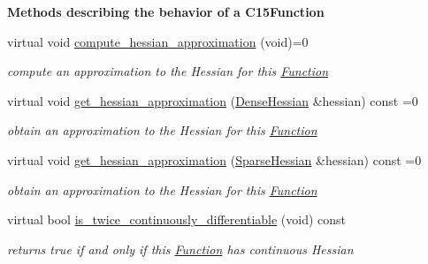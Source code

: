 \begin{Indent}\textbf{ Methods describing the behavior of a C15\+Function}\par
\begin{DoxyCompactItemize}
\item 
virtual void \mbox{\hyperlink{class_s_m_spp__di__unipi__it_1_1_c15_function_a50c8f5b1802c658a795d266ba66e3c29}{compute\+\_\+hessian\+\_\+approximation}} (void)=0
\begin{DoxyCompactList}\small\item\em compute an approximation to the Hessian for this \mbox{\hyperlink{class_s_m_spp__di__unipi__it_1_1_function}{Function}} \end{DoxyCompactList}\item 
virtual void \mbox{\hyperlink{class_s_m_spp__di__unipi__it_1_1_c15_function_a83dab9644742319aa313786952a15a78}{get\+\_\+hessian\+\_\+approximation}} (\mbox{\hyperlink{class_s_m_spp__di__unipi__it_1_1_c15_function_ae7dd5ecf6e8711dc10787bb8d80b355b}{Dense\+Hessian}} \&hessian) const =0
\begin{DoxyCompactList}\small\item\em obtain an approximation to the Hessian for this \mbox{\hyperlink{class_s_m_spp__di__unipi__it_1_1_function}{Function}} \end{DoxyCompactList}\item 
virtual void \mbox{\hyperlink{class_s_m_spp__di__unipi__it_1_1_c15_function_a5e5b31d85711c9e27252b7af6ff7e214}{get\+\_\+hessian\+\_\+approximation}} (\mbox{\hyperlink{class_s_m_spp__di__unipi__it_1_1_c15_function_af95b7c5c0969f493222b30b17aa58515}{Sparse\+Hessian}} \&hessian) const =0
\begin{DoxyCompactList}\small\item\em obtain an approximation to the Hessian for this \mbox{\hyperlink{class_s_m_spp__di__unipi__it_1_1_function}{Function}} \end{DoxyCompactList}\item 
virtual bool \mbox{\hyperlink{class_s_m_spp__di__unipi__it_1_1_c15_function_af95feab5ca3e555525ad19786347e2ec}{is\+\_\+twice\+\_\+continuously\+\_\+differentiable}} (void) const
\begin{DoxyCompactList}\small\item\em returns true if and only if this \mbox{\hyperlink{class_s_m_spp__di__unipi__it_1_1_function}{Function}} has continuous Hessian \end{DoxyCompactList}\end{DoxyCompactItemize}
\end{Indent}
